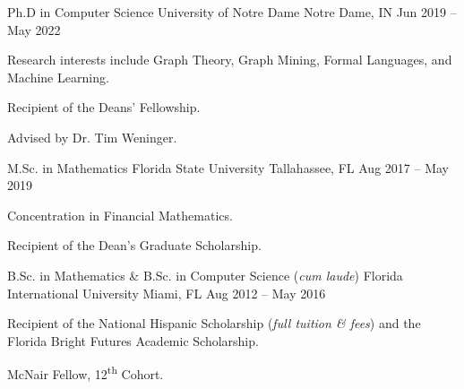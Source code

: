 


\begin{cventries}


    \cventry
    {Ph.D in Computer Science} %
    {University of Notre Dame} %
    {Notre Dame, IN} %
    {Jun 2019 -- May 2022} %
    {
        \begin{cvitems} %
        \item{Research interests include Graph Theory, Graph Mining, Formal Languages, and Machine Learning.}
        \item{Recipient of the Deans' Fellowship.}
        \item{Advised by Dr. Tim Weninger.}
        \end{cvitems}
    }

    \cventry
    {M.Sc. in Mathematics} %
    {Florida State University} %
    {Tallahassee, FL} %
    {Aug 2017 -- May 2019} %
    {
        \begin{cvitems} %
        \item{Concentration in Financial Mathematics.}
        \item{Recipient of the Dean's Graduate Scholarship.}
        \end{cvitems}
    }

    \cventry
    {B.Sc. in Mathematics \& B.Sc. in Computer Science (\textit{cum laude})} %
    {Florida International University} %
    {Miami, FL} %
    {Aug 2012 -- May 2016} %
    {
        \begin{cvitems} %
        \item{Recipient of the National Hispanic Scholarship (\textit{full tuition \& fees}) and the Florida Bright Futures Academic Scholarship.}
        \item{McNair Fellow, 12\textsuperscript{th} Cohort.}
        \end{cvitems}
    }


\end{cventries}
